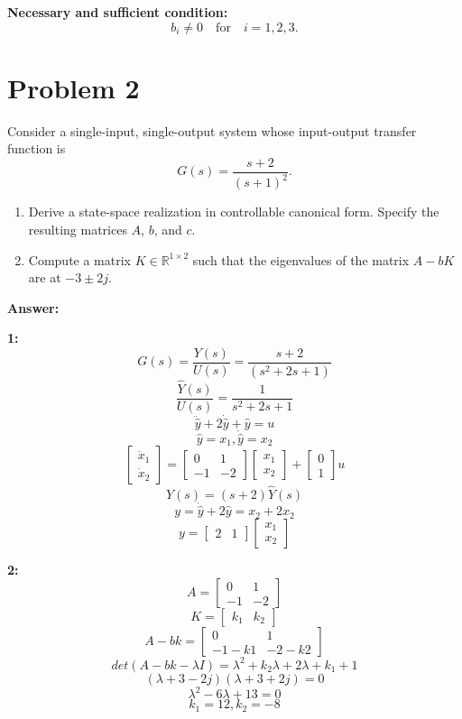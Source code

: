 \documentclass[12pt]{article}
\begin{document}
\textbf{Necessary and sufficient condition:}
\[
b_i \ne 0 \quad \text{for} \quad i = 1, 2, 3.
\]


\section*{Problem 2}
Consider a single-input, single-output system whose input-output transfer function is
\[
G(s) = \frac{s + 2}{(s + 1)^2}.
\]

\begin{enumerate}
    \item Derive a state-space realization in controllable canonical form. Specify the resulting matrices \( A \), \( b \), and \( c \).
    \item Compute a matrix \( K \in \mathbb{R}^{1 \times 2} \) such that the eigenvalues of the matrix \( A - bK \) are at \( -3 \pm 2j \).
\end{enumerate}

\textbf{Answer:}

\textbf{1:}
\[G(s) = \frac{Y(s)}{U(s)} = \frac{s+2}{(s^2+2s+1)}\]
\[\frac{\hat{Y}(s)}{U(s)} = \frac{1}{s^2+2s+1}\]
\[\ddot{\hat{y}} + 2\dot{\hat{y}} + \hat{y} = u\]
\[\hat{y} = x_1, \dot{\hat{y}} = x_2\]
\[
\begin{bmatrix}
\dot{x}_1 \\
\dot{x}_2
\end{bmatrix}
=
\begin{bmatrix}
0 & 1 \\
-1 & -2
\end{bmatrix}
\begin{bmatrix}
x_1 \\
x_2
\end{bmatrix}
+
\begin{bmatrix}
0 \\    
1
\end{bmatrix}
u
\]
\[Y(s) = (s+2)\hat{Y}(s)\]
\[y = \dot{\hat{y}} + 2\hat{y} = x_2 + 2x_2\]
\[
y = \begin{bmatrix}
2 & 1
\end{bmatrix}
\begin{bmatrix}
x_1 \\
x_2
\end{bmatrix}
\]

\textbf{2:}
\[
A = \begin{bmatrix}
0 & 1 \\
-1 & -2
\end{bmatrix}
\]
\[
K = \begin{bmatrix}
k_1 & k_2
\end{bmatrix}
\]
\[
A-bk = \begin{bmatrix}
0 & 1 \\
-1-k1 & -2-k2
\end{bmatrix}  
\]
\[det(A-bk-\lambda I) = \lambda^2 + k_2\lambda + 2\lambda + k_1 + 1\]
\[(\lambda+3-2j)(\lambda+3+2j) = 0\]
\[\lambda^2-6\lambda+13=0\]
\[k_1=12, k_2=-8\]
\end{document}

